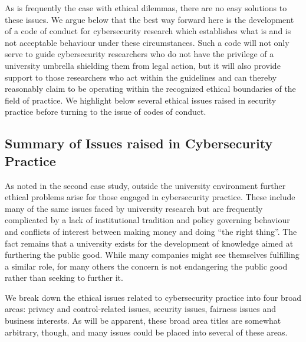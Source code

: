 \documentclass{svjour3}                     %
\begin{document}
As is frequently the case with ethical dilemmas, there are no easy solutions to these issues. We argue below that the best way forward here is the development of a code of conduct for cybersecurity research which establishes what is and is not acceptable behaviour under these circumstances. Such a code will not only serve to guide cybersecurity researchers who do not have the privilege of a university umbrella shielding them from legal action, but it will also provide support to those researchers who act within the guidelines and can thereby reasonably claim to be operating within the recognized ethical boundaries of the field of practice. We highlight below several ethical issues raised in security practice before turning to the issue of codes of conduct.


\subsection{Summary of Issues raised in Cybersecurity Practice}
\label{sec:industryissues}
As noted in the second case study, outside the university environment further ethical problems arise for those engaged in cybersecurity practice.  These include many of the same issues faced by university research but are frequently complicated by a lack of institutional tradition and policy governing behaviour and conflicts of interest between making money and doing “the right thing”. The fact remains that a university exists for the development of knowledge aimed at furthering the public good.  While many companies might see themselves fulfilling a similar role, for many others the concern is not endangering the public good rather than seeking to further it.

We break down the ethical issues related to cybersecurity practice into four broad areas: privacy and control-related issues, security issues, fairness issues and business interests. As will be apparent, these broad area titles are somewhat arbitrary, though, and many issues could be placed into several of these areas.
\end{document}
